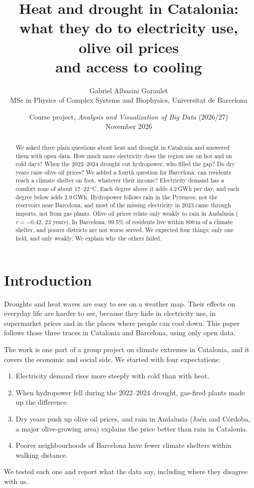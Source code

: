 \documentclass[11pt,a4paper]{article}
\title{\textbf{Heat and drought in Catalonia:\\ what they do to electricity use, olive oil prices\\ and access to cooling}}
\author{Gabriel Albasini Garaulet\\[2pt]
\small MSc in Physics of Complex Systems and Biophysics, Universitat de Barcelona}
\date{\small Course project, \emph{Analysis and Visualization of Big Data} (2026/27)\\ November 2026}
\begin{document}
\maketitle

\begin{abstract}
\noindent
We asked three plain questions about heat and drought in Catalonia and answered them with open data. How much more electricity does the region use on hot and on cold days? When the 2022--2024 drought cut hydropower, who filled the gap? Do dry years raise olive oil prices? We added a fourth question for Barcelona: can residents reach a climate shelter on foot, whatever their income? Electricity demand has a comfort zone of about 17--22\,$^\circ$C. Each degree above it adds 4.2\,GWh per day, and each degree below adds 2.9\,GWh. Hydropower follows rain in the Pyrenees, not the reservoirs near Barcelona, and most of the missing electricity in 2023 came through imports, not from gas plants. Olive oil prices relate only weakly to rain in Andalusia ($r=-0.42$, 23 years). In Barcelona, 99.5\% of residents live within 800\,m of a climate shelter, and poorer districts are not worse served. We expected four things; only one held, and only weakly. We explain why the others failed.
\end{abstract}

\section{Introduction}

Droughts and heat waves are easy to see on a weather map. Their effects on everyday life are harder to see, because they hide in electricity use, in supermarket prices and in the places where people can cool down. This paper follows those three traces in Catalonia and Barcelona, using only open data.

The work is one part of a group project on climate extremes in Catalonia, and it covers the economic and social side. We started with four expectations:
\begin{enumerate}
\item[\textbf{H1}] Electricity demand rises more steeply with cold than with heat.
\item[\textbf{H2}] When hydropower fell during the 2022--2024 drought, gas-fired plants made up the difference.
\item[\textbf{H3}] Dry years push up olive oil prices, and rain in Andalusia (Ja\'en and C\'ordoba, a major olive-growing area) explains the price better than rain in Catalonia.
\item[\textbf{H4}] Poorer neighbourhoods of Barcelona have fewer climate shelters within walking distance.
\end{enumerate}
We tested each one and report what the data say, including where they disagree with us.
\end{document}
